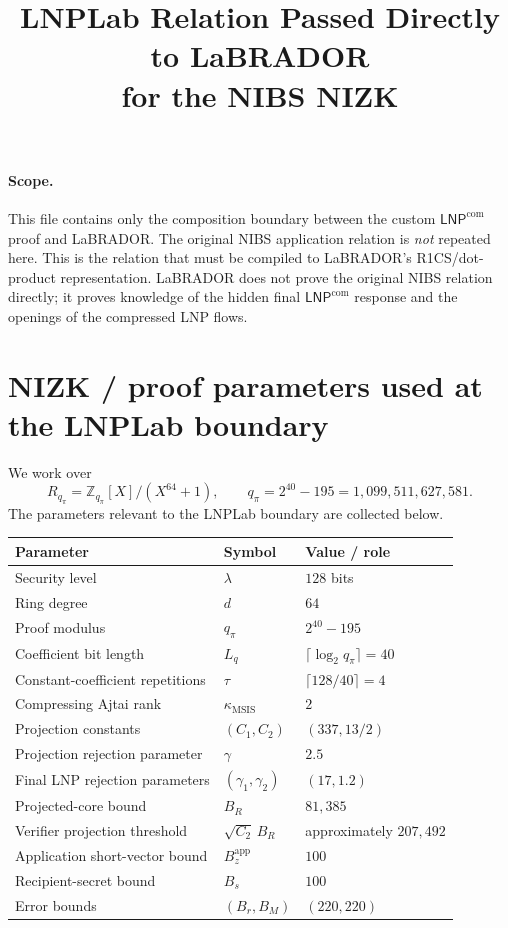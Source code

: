 \documentclass[11pt]{article}
\title{LNPLab Relation Passed Directly to LaBRADOR\\for the NIBS NIZK}
\author{}
\date{}
\newcommand{\Rpi}{R_{q_\pi}}
\newcommand{\LNP}{\mathsf{LNP}}
\begin{document}
\maketitle

\paragraph{Scope.}
This file contains only the composition boundary between the custom
$\LNP^{\mathrm{com}}$ proof and LaBRADOR.  The original NIBS application
relation is \emph{not} repeated here.  This is the relation that must be
compiled to LaBRADOR's R1CS/dot-product representation.  LaBRADOR does not
prove the original NIBS relation directly; it proves knowledge of the hidden
final $\LNP^{\mathrm{com}}$ response and the openings of the compressed LNP
flows.

\section{NIZK / proof parameters used at the LNPLab boundary}

We work over
\[
  \Rpi=\mathbb Z_{q_\pi}[X]/(X^{64}+1),
  \qquad
  q_\pi=2^{40}-195=1{,}099{,}511{,}627{,}581.
\]
The parameters relevant to the LNPLab boundary are collected below.

\begin{center}
\begin{tabular}{>{\raggedright\arraybackslash}p{}
                >{\centering\arraybackslash}p{}
                >{\raggedright\arraybackslash}p{}}
\toprule
Parameter & Symbol & Value / role \\
\midrule
Security level & $\lambda$ & $128$ bits \\
Ring degree & $d$ & $64$ \\
Proof modulus & $q_\pi$ & $2^{40}-195$ \\
Coefficient bit length & $L_q$ & $\lceil\log_2 q_\pi\rceil=40$ \\
Constant-coefficient repetitions & $\tau$ & $\lceil128/40\rceil=4$ \\
Compressing Ajtai rank & $\kappa_{\mathrm{MSIS}}$ & $2$ \\
Projection constants & $(C_1,C_2)$ & $(337,13/2)$ \\
Projection rejection parameter & $\gamma$ & $2.5$ \\
Final LNP rejection parameters & $(\gamma_1,\gamma_2)$ & $(17,1.2)$ \\
Projected-core bound & $B_R$ & $81{,}385$ \\
Verifier projection threshold & $\sqrt{C_2}\,B_R$ & approximately $207{,}492$ \\
Application short-vector bound & $B_z^{\mathrm{app}}$ & $100$ \\
Recipient-secret bound & $B_s$ & $100$ \\
Error bounds & $(B_r,B_M)$ & $(220,220)$ \\
\bottomrule
\end{tabular}
\end{center}
\end{document}
